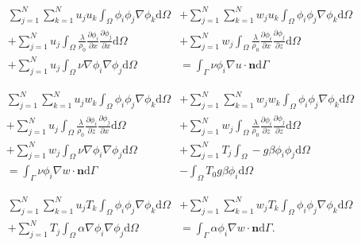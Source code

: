 \begin{align}
\label{eq:femconvection:galerkinu}
\sum^N_{j=1}\sum^N_{k=1}u_ju_k\int_\Omega \phi_i\phi_j\nabla\phi_k \mathrm{d}\Omega &+
\sum^N_{j=1}\sum^N_{k=1}w_ju_k\int_\Omega \phi_i\phi_j\nabla\phi_k \mathrm{d}\Omega  \\ +
\nonumber
\sum^N_{j=1} u_j\int_\Omega\frac{\lambda}{\rho_0}
\frac{\partial \phi_i}{\partial x}\frac{\partial \phi_j}{\partial x} \mathrm{d}\Omega &+
\sum^N_{j=1} w_j\int_\Omega\frac{\lambda}{\rho_0}\frac{\partial \phi_i}{\partial x}
\frac{\partial \phi_j}{\partial z} \mathrm{d}\Omega  \\ +
\nonumber
\sum^N_{j=1} u_j \int_\Omega \nu\nabla\phi_i\nabla\phi_j \mathrm{d}\Omega &=
\int_\Gamma \nu\phi_i\nabla u \cdot \mathbf{n} \mathrm{d}\Gamma
\end{align}

\begin{align}
\label{eq:femconvection:galerkinw}
\sum^N_{j=1}\sum^N_{k=1}u_jw_k\int_\Omega \phi_i\phi_j\nabla\phi_k \mathrm{d}\Omega &+
\sum^N_{j=1}\sum^N_{k=1}w_jw_k\int_\Omega \phi_i\phi_j\nabla\phi_k \mathrm{d}\Omega \\ +
\nonumber
\sum^N_{j=1} u_j\int_\Omega \frac{\lambda}{\rho_0}\frac{\partial \phi_i}{\partial z}
\frac{\partial \phi_j}{\partial x} \mathrm{d}\Omega &+
\sum^N_{j=1} w_j\int_\Omega \frac{\lambda}{\rho_0}
\frac{\partial \phi_i}{\partial z}\frac{\partial \phi_j}{\partial z} \mathrm{d}\Omega \\ +
\nonumber
\sum^N_{j=1} w_j \int_\Omega \nu\nabla\phi_i\nabla\phi_j \mathrm{d}\Omega &+
\sum^N_{j=1}T_j \int_\Omega - g\beta\phi_i\phi_j \mathrm{d}\Omega \\
\nonumber
= \int_\Gamma \nu\phi_i\nabla w \cdot \mathbf{n} \mathrm{d}\Gamma &-
\int_\Omega T_0g\beta\phi_i\mathrm{d}\Omega
\end{align}

\begin{align}
\label{eq:femconvection:galerkinT}
\sum^N_{j=1}\sum^N_{k=1}u_jT_k\int_\Omega \phi_i\phi_j\nabla\phi_k \mathrm{d}\Omega &+
\sum^N_{j=1}\sum^N_{k=1}w_jT_k\int_\Omega \phi_i\phi_j\nabla\phi_k \mathrm{d}\Omega \\ +
\nonumber
\sum^N_{j=1} T_j \int_\Omega \alpha\nabla\phi_i\nabla\phi_j \mathrm{d}\Omega &=
\int_\Gamma \alpha\phi_i\nabla w \cdot \mathbf{n} \mathrm{d}\Gamma.
\end{align}


